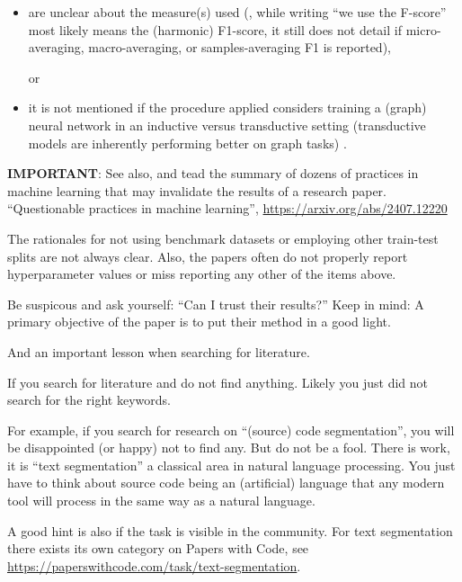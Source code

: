 \documentclass[sigconf, review, nonacm]{acmart}
\begin{document}
\begin{tcolorbox}[title=Instructions: Checklist with Criteria]
\begin{itemize}
\item are unclear about the measure(s) used (\eg, while writing ``we use the F-score'' most likely means the (harmonic) F1-score, it still does not detail if micro-averaging, macro-averaging, or samples-averaging F1 is reported),
%

or

\item it is not mentioned if the procedure applied considers training a (graph) neural network in an inductive versus transductive setting (transductive models are inherently performing better on graph tasks)
%
.


\end{itemize}

\textbf{IMPORTANT}: See also, and tead the summary of dozens of practices in machine learning that may invalidate the results of a research paper.
%
``Questionable practices in machine learning'', \url{https://arxiv.org/abs/2407.12220}

\end{tcolorbox}

The rationales for not using benchmark datasets or employing other train-test splits are not always clear.
Also, the papers often do not properly report hyperparameter values or miss reporting any other of the items above.

\begin{tcolorbox}[title=As a general rule when reading related work]

Be suspicous and ask yourself: ``Can I trust their results?''
Keep in mind: A primary objective of the paper is to put their method in a good light.
\end{tcolorbox}

And an important lesson when searching for literature.

\begin{tcolorbox}[title=Lesson learned (once) again!]
If you search for literature and do not find anything. Likely you just did not search for the right keywords.

For example, if you search for research on ``(source) code segmentation'', you will be disappointed (or happy) not to find any.
But do not be a fool. 
There is work, it is ``text segmentation'' a classical area in natural language processing.
You just have to think about source code being an (artificial) language that any modern tool will process in the same way as a natural language.

A good hint is also if the task is visible in the community.
For text segmentation there exists its own category on Papers with Code, see \url{https://paperswithcode.com/task/text-segmentation}.
\end{tcolorbox}
\end{document}

